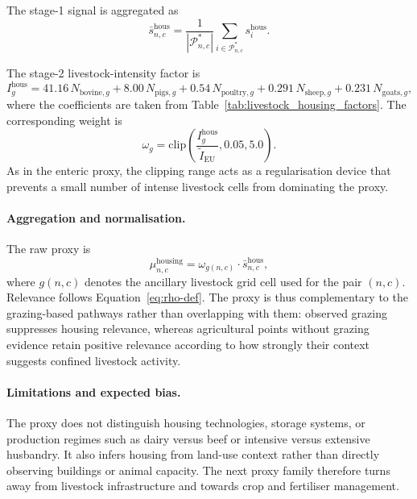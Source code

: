 The stage-1 signal is aggregated as
\begin{equation}
  \bar{s}_{n,c}^{\mathrm{hous}} =
  \frac{1}{|\mathcal{P}^{*}_{n,c}|}
  \sum_{i \in \mathcal{P}^{*}_{n,c}} s_i^{\mathrm{hous}}.
\end{equation}

The stage-2 livestock-intensity factor is
\begin{equation}
  I_g^{\mathrm{hous}} =
  41.16\,N_{\mathrm{bovine},g}
  + 8.00\,N_{\mathrm{pigs},g}
  + 0.54\,N_{\mathrm{poultry},g}
  + 0.291\,N_{\mathrm{sheep},g}
  + 0.231\,N_{\mathrm{goats},g},
\end{equation}
where the coefficients are taken from
Table~\ref{tab:livestock_housing_factors}. The corresponding weight is
\begin{equation}
  \omega_g =
  \mathrm{clip}\!\left(
    \frac{I_g^{\mathrm{hous}}}{\tilde{I}_{\mathrm{EU}}},
    0.05, 5.0
  \right).
\end{equation}
As in the enteric proxy, the clipping range acts as a regularisation
device that prevents a small number of intense livestock cells from
dominating the proxy.

\paragraph{Aggregation and normalisation.}
The raw proxy is
\begin{equation}
  \mu_{n,c}^{\mathrm{housing}} =
  \omega_{g(n,c)} \cdot \bar{s}_{n,c}^{\mathrm{hous}},
\end{equation}
where $g(n,c)$ denotes the ancillary livestock grid cell used for the
pair $(n,c)$. Relevance follows Equation~\ref{eq:rho-def}. The proxy is
thus complementary to the grazing-based pathways rather than
overlapping with them: observed grazing suppresses housing relevance,
whereas agricultural points without grazing evidence retain positive
relevance according to how strongly their context suggests confined
livestock activity.

\paragraph{Limitations and expected bias.}
The proxy does not distinguish housing technologies, storage systems,
or production regimes such as dairy versus beef or intensive versus
extensive husbandry. It also infers housing from land-use context
rather than directly observing buildings or animal capacity. The next
proxy family therefore turns away from livestock infrastructure and
towards crop and fertiliser management.

